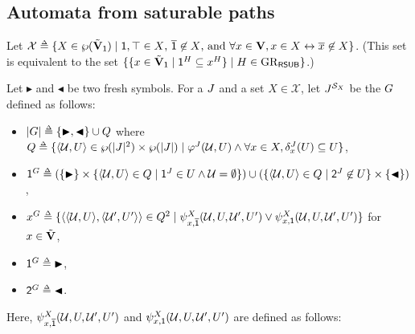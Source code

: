 \newcommand{\Aset}{X}
\subsection{Automata from saturable paths}\label{section: NFA}
Let $\mathcal{X} \defeq \set{\Aset \in \wp(\tilde{\vsig}_{\id}) \mid \id, \top \in \Aset$, $\com{\id} \not\in \Aset$, and $\forall x \in \vsig, x \in \Aset \leftrightarrow \com{x} \not\in \Aset}$.
(This set is equivalent to the set $\set{\set{x \in \tilde{\vsig}_{\id} \mid \id^{\graph[2]} \subseteq x^{\graph[2]}} \mid \graph[2] \in \allgraph_{\RSUB}}$.)
\begin{definition}\label{definition: NFA}
    Let $\blacktriangleright$ and $\blacktriangleleft$ be two fresh symbols.
    For a  $\graph[3]$ and a set $X \in \mathcal{X}$,
    let $\graph[3]^{\FillS_{X}}$ be the  $\graph[1]$ defined as follows:
    \begin{itemize}
        \item $\domain{\graph[1]} \defeq \set{\blacktriangleright, \blacktriangleleft}  \cup Q$
        where $Q \defeq \set{\tuple{\mathcal{U}, U} \in \wp(\domain{\graph[3]}^2) \times \wp(\domain{\graph[3]}) \mid \fml^{\graph[3]}(\mathcal{U}, U) \land \forall x \in \Aset, \delta_{x}^{\graph[3]}(U) \subseteq U}$,                                                                                                                                                                         
        \item $\id^{\graph[1]}   \defeq (\set{\blacktriangleright} \times \set{\tuple{\mathcal{U}, U} \in Q \mid \src^{\graph[3]} \in U \land \mathcal{U} = \emptyset}) \cup (\set{\tuple{\mathcal{U}, U} \in Q \mid \tgt^{\graph[3]} \not\in U} \times \set{\blacktriangleleft})$, 
        \item $x^{\graph[1]}      \defeq \set{\tuple{\tuple{\mathcal{U}, U}, \tuple{\mathcal{U}',U'}} \in Q^2 \mid \fml[2]_{x, \com{\id}}^{\Aset}(\mathcal{U}, U, \mathcal{U}', U') \lor  \fml[2]_{x, \id}^{\Aset}(\mathcal{U}, U, \mathcal{U}', U')}$ for $x \in \tilde{\mathbf{V}}$,        
        \item $\src^{\graph[1]}   \defeq {\blacktriangleright}$,
        \item $\tgt^{\graph[1]} \defeq  {\blacktriangleleft}$.
    \end{itemize}
    Here, $\fml[2]_{x, \com{\id}}^{\Aset}(\mathcal{U}, U, \mathcal{U}', U')$ and $\fml[2]_{x, \id}^{\Aset}(\mathcal{U}, U, \mathcal{U}', U')$ are defined as follows:
    \begin{itemize}

\end{itemize}
\end{definition}
